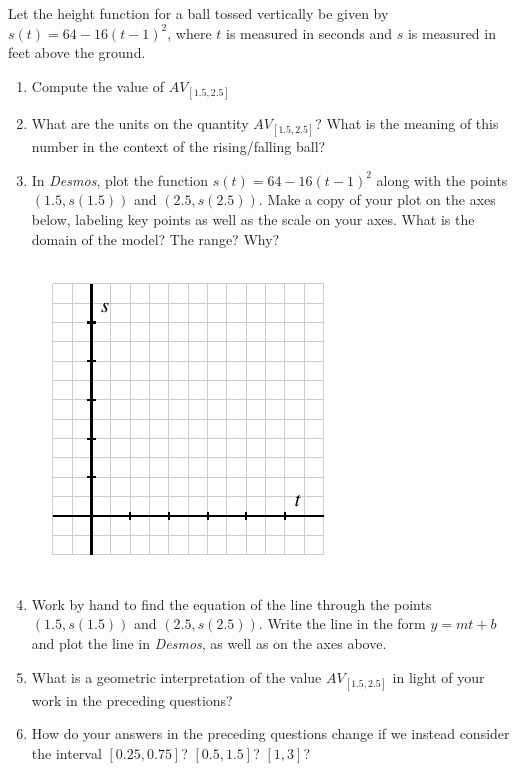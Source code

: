 \documentclass[nooutcomes]{ximera}
\begin{document}
\begin{exploration}
Let the height function for a ball tossed vertically be given by \(s(t) = 64 - 16(t-1)^2\), where \(t\) is measured in seconds and \(s\) is measured in feet above the ground.
\begin{enumerate}[label=\alph*.]
\item Compute the value of \(AV_{[1.5,2.5]}\)
\item What are the units on the quantity \(AV_{[1.5,2.5]}\)? What is the meaning of this number in the context of the rising/falling ball?
\item In \emph{Desmos}, plot the function \(s(t) = 64 - 16(t-1)^2\) along with the points \((1.5,s(1.5))\) and \((2.5, s(2.5))\). Make a copy of your plot on the axes below, labeling key points as well as the scale on your axes. What is the domain of the model? The range? Why?
\begin{image}
\includegraphics{aroc-s-t-blank-axes}
\end{image}
\item Work by hand to find the equation of the line through the points \((1.5,s(1.5))\) and \((2.5, s(2.5))\). Write the line in the form \(y = mt + b\) and plot the line in \emph{Desmos}, as well as on the axes above.
\item What is a geometric interpretation of the value \(AV_{[1.5,2.5]}\) in light of your work in the preceding questions?
\item How do your answers in the preceding questions change if we instead consider the interval \([0.25, 0.75]\)? \([0.5, 1.5]\)? \([1,3]\)?
\end{enumerate}
\end{exploration}


\end{document}

